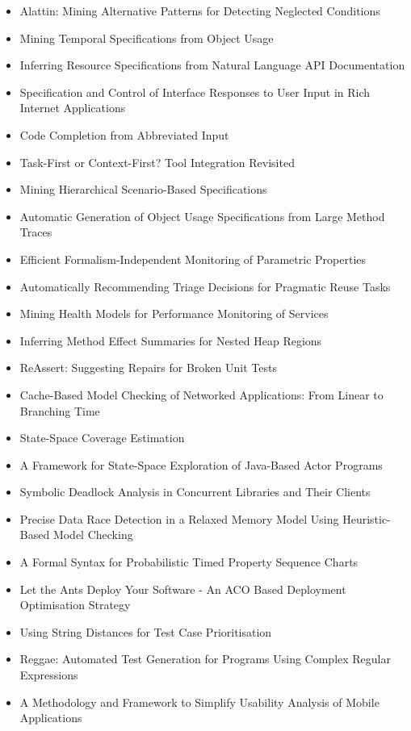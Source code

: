 {\begin{itemize}[itemsep=-1ex]
  \item Alattin: Mining Alternative Patterns for Detecting Neglected Conditions
  \item Mining Temporal Specifications from Object Usage
  \item Inferring Resource Specifications from Natural Language API Documentation
  \item Specification and Control of Interface Responses to User Input in Rich Internet Applications
  \item Code Completion from Abbreviated Input
  \item Task-First or Context-First? Tool Integration Revisited
  \item Mining Hierarchical Scenario-Based Specifications
  \item Automatic Generation of Object Usage Specifications from Large Method Traces
  \item Efficient Formalism-Independent Monitoring of Parametric Properties
  \item Automatically Recommending Triage Decisions for Pragmatic Reuse Tasks
  \item Mining Health Models for Performance Monitoring of Services
  \item Inferring Method Effect Summaries for Nested Heap Regions
  \item ReAssert: Suggesting Repairs for Broken Unit Tests
  \item Cache-Based Model Checking of Networked Applications: From Linear to Branching Time
  \item State-Space Coverage Estimation
  \item A Framework for State-Space Exploration of Java-Based Actor Programs
  \item Symbolic Deadlock Analysis in Concurrent Libraries and Their Clients
  \item Precise Data Race Detection in a Relaxed Memory Model Using Heuristic-Based Model Checking
  \item A Formal Syntax for Probabilistic Timed Property Sequence Charts
  \item Let the Ants Deploy Your Software - An ACO Based Deployment Optimisation Strategy
  \item Using String Distances for Test Case Prioritisation
  \item Reggae: Automated Test Generation for Programs Using Complex Regular Expressions
  \item A Methodology and Framework to Simplify Usability Analysis of Mobile Applications

\end{itemize}}
